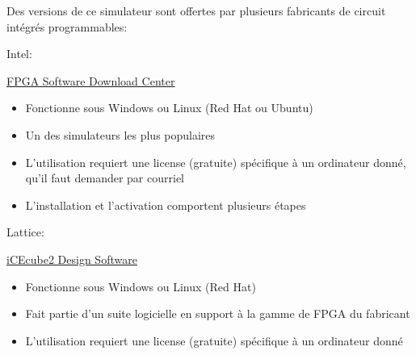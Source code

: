 \documentclass[11pt]{article}
\begin{document}
Des versions de ce simulateur sont offertes par plusieurs
fabricants de circuit intégrés programmables:

Intel: 

\href{https://www.intel.com/content/www/us/en/collections/products/fpga/software/downloads.html?s=Newest\&f=\%255B\%257B\%2522name\%2522\%3A\%2522quartusedition\%2522\%2C\%2522facetId\%2522\%3A\%2522quartusedition\%2522\%2C\%2522currentValues\%2522\%3A\%255B\%255D\%257D\%2C\%257B\%2522name\%2522\%3A\%2522quartusaddon\%2522\%2C\%2522facetId\%2522\%3A\%2522quartusaddon\%2522\%2C\%2522currentValues\%2522\%3A\%255B\%257B\%2522value\%2522\%3A\%2522Intel\%25C2\%25AE\%2520FPGA\%2520Simulation\%2520Tools\%2522\%2C\%2522state\%2522\%3A\%2522idle\%2522\%2C\%2522children\%2522\%3A\%255B\%257B\%2522value\%2522\%3A\%2522Questa*-Intel\%25C2\%25AE\%2520FPGA\%2520Starter\%2520Edition\%2522\%2C\%2522state\%2522\%3A\%2522selected\%2522\%257D\%255D\%257D\%255D\%257D\%2C\%257B\%2522name\%2522\%3A\%2522fpgadevicefamily\%2522\%2C\%2522facetId\%2522\%3A\%2522fpgadevicefamily\%2522\%2C\%2522currentValues\%2522\%3A\%255B\%255D\%257D\%2C\%257B\%2522name\%2522\%3A\%2522fpgaplatform\%2522\%2C\%2522facetId\%2522\%3A\%2522fpgaplatform\%2522\%2C\%2522currentValues\%2522\%3A\%255B\%255D\%257D\%2C\%257B\%2522facetId\%2522\%3A\%2522os-rdc\%2522\%2C\%2522name\%2522\%3A\%2522OperatingSystem\%2522\%2C\%2522currentValues\%2522\%3A\%255B\%255D\%257D\%2C\%257B\%2522facetId\%2522\%3A\%2522\%40emtcontenttype\_en\%2522\%2C\%2522name\%2522\%3A\%2522ContentType\%2522\%2C\%2522currentValues\%2522\%3A\%255B\%255D\%257D\%2C\%257B\%2522facetId\%2522\%3A\%2522lastupdated-rdc\%2522\%2C\%2522name\%2522\%3A\%2522lastupdated\%2522\%2C\%2522currentValues\%2522\%3A\%255B\%255D\%257D\%255D\&q=lite}{FPGA Software Download Center}


\begin{itemize}
\item Fonctionne sous Windows ou Linux (Red Hat ou Ubuntu)
\item Un des simulateurs les plus populaires
\item L'utilisation requiert une license (gratuite) spécifique à un
ordinateur donné, qu'il faut demander par courriel
\item L'installation et l'activation comportent plusieurs étapes
\end{itemize}


Lattice:

\href{http://www.latticesemi.com/icecube2}{iCEcube2 Design Software}

\begin{itemize}
\item Fonctionne sous Windows ou Linux (Red Hat)
\item Fait partie d'un suite logicielle en support à la gamme de FPGA du
fabricant
\item L'utilisation requiert une license (gratuite) spécifique à un
ordinateur donné
\end{itemize}
\end{document}
